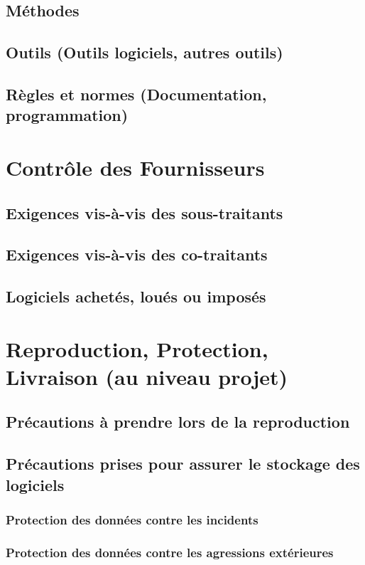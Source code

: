\subsection{Méthodes}
\subsection{Outils (Outils logiciels, autres outils)}
\subsection{Règles et normes   (Documentation, programmation)}		

\section{Contrôle des Fournisseurs}
\subsection{Exigences vis-à-vis des sous-traitants}
\subsection{Exigences vis-à-vis des co-traitants}
\subsection{Logiciels achetés, loués ou imposés}

\section{Reproduction, Protection, Livraison (au niveau projet)}
\subsection{Précautions à prendre lors de la reproduction}
\subsection{Précautions prises pour assurer le stockage des logiciels}
\subsubsection{Protection des données contre les incidents}
\subsubsection{Protection des données contre les agressions extérieures}
